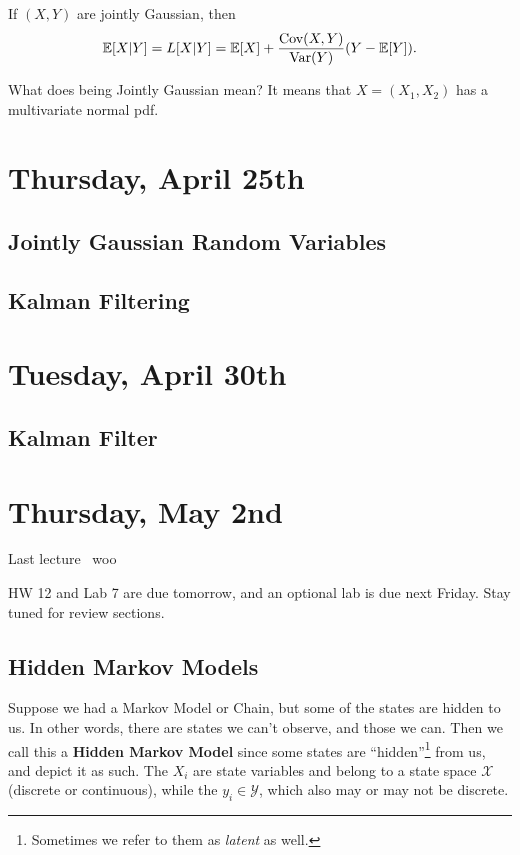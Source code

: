\documentclass[11 pt]{scrartcl}
\begin{document}
\begin{theorem}[Walrand 7.8]
    If $(X,Y)$ are jointly Gaussian, then 
    \[ \mathbb E[X|Y] = L[X|Y]  = \mathbb E[X] + \dfrac{\text{Cov}(X,Y)}{\text{Var}(Y)} (Y - \mathbb E[Y]).\] 
\end{theorem}

What does being Jointly Gaussian mean? It means that $X = (X_1, X_2)$ has a multivariate normal pdf. 

\newpage
\section{Thursday, April 25th}

\subsection{Jointly Gaussian Random Variables}

\subsection{Kalman Filtering}

\newpage 
\section{Tuesday, April 30th}

\subsection{Kalman Filter}


\newpage
\section{Thursday, May 2nd}
Last lecture ~woo~

HW 12 and Lab 7 are due tomorrow, and an optional lab is due next Friday. Stay tuned for review sections. 

\subsection{Hidden Markov Models}
Suppose we had a Markov Model or Chain, but some of the states are hidden to us. In other words, there are states we can't observe, and those we can. Then we call this a \textbf{Hidden Markov Model} since some states are ``hidden''\footnote{Sometimes we refer to them as \textit{latent} as well.} from us, and depict it as such. The $X_i$ are state variables and belong to a state space $\mathcal{X}$ (discrete or continuous), while the $y_i \in \mathcal{Y}$, which also may or may not be discrete. 
\end{document}
